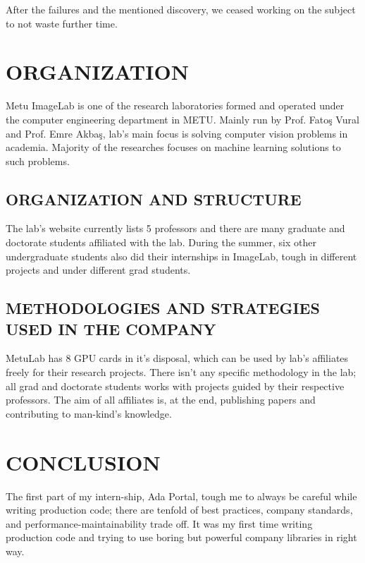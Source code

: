 \documentclass[titlepage, a4paper, 14pt]{extarticle} %
\begin{document}
After the failures and the mentioned discovery, we ceased working on the subject to not waste further time.





\section{ORGANIZATION} \label{organization}

Metu ImageLab is one of the research laboratories formed and operated under the computer engineering department in METU. Mainly run by Prof. Fatoş Vural and Prof. Emre Akbaş, lab's main focus is solving computer vision problems in academia. Majority of the researches focuses on machine learning solutions to such problems.

\subsection{ORGANIZATION AND STRUCTURE} \label{structure}

The lab's website \cite{imagelab} currently lists 5 professors and there are many graduate and doctorate students affiliated with the lab. During the summer, six other undergraduate students also did their internships in ImageLab, tough in different projects and under different grad students. \\



\subsection{METHODOLOGIES AND STRATEGIES USED IN THE COMPANY} \label{strategies}

MetuLab has 8 GPU cards in it's disposal, which can be used by lab's affiliates freely for their research projects. There isn't any specific methodology in the lab; all grad and doctorate students works with projects guided by their respective professors. The aim of all affiliates is, at the end, publishing papers and contributing to man-kind's knowledge.


\section{CONCLUSION} \label{conclusion}

The first part of my intern-ship, Ada Portal, tough me to always be careful while writing production code; there are tenfold of best practices, company standards, and performance-maintainability trade off. It was my first time writing production code and trying to use boring but powerful company libraries in right way.\\
\end{document}
